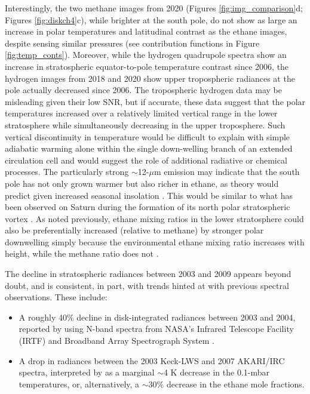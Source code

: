 \documentclass[twocolumn,10pt]{aastex631}
\begin{document}
Interestingly, the two methane images from 2020 (Figures \ref{fig:img_comparison}d; Figures \ref{fig:diskch4}c), while brighter at the south pole, do not show as large an increase in polar temperatures and latitudinal contrast as the ethane images, despite sensing similar pressures (see contribution functions in Figure \ref{fig:temp_conts}).  Moreover, while the hydrogen quadrupole spectra show an increase in stratospheric equator-to-pole temperature contrast since 2006, the hydrogen images from 2018 and 2020 show upper tropospheric radiances at the pole actually decreased since 2006. The tropospheric hydrogen data may be misleading given their low SNR, but if accurate, these data suggest that the polar temperatures increased over a relatively limited vertical range in the lower stratosphere while simultaneously decreasing in the upper troposphere.  Such vertical discontinuity in temperature would be difficult to explain with simple adiabatic warming alone within the single down-welling branch of an extended circulation cell \citep[\textit{e.g.},][]{dePater2014neptune} and would suggest the role of additional radiative or chemical processes. The particularly strong $\sim$12-$\mu$m emission may indicate that the south pole has not only grown warmer but also richer in ethane, as theory would predict given increased seasonal insolation \citep{moses2005photochemistry,moses2018seasonal}. This would be similar to what has been observed on Saturn during the formation of its north polar stratospheric vortex \citep{fletcher2018saturnhexagon}. As noted previously, ethane mixing ratios in the lower stratosphere could also be preferentially increased (relative to methane) by stronger polar downwelling simply because the environmental ethane mixing ratio increases with height, while the methane ratio does not \citep[\textit{e.g.},][]{moses2005photochemistry,moses2018seasonal}. 

The decline in stratospheric radiances between 2003 and 2009 appears beyond doubt, and is consistent, in part, with trends hinted at with previous spectral observations.  These include: 
\begin{itemize}
    \item{A roughly 40\% decline in disk-integrated radiances between 2003 and 2004,} reported by \citet{hammel2006mid} using N-band spectra from NASA’s Infrared Telescope Facility (IRTF) and Broadband Array Spectrograph System \citep[BASS;][]{hackwell1990low}.

    \item{A drop in radiances between the 2003 Keck-LWS and 2007 AKARI/IRC spectra, interpreted by \citet{fletcher2014neptune} as a marginal $\sim$4 K decrease in the 0.1-mbar temperatures, or, alternatively, a $\sim$30$\%$ decrease in the ethane mole fractions.}
\end{itemize}   
\end{document}
